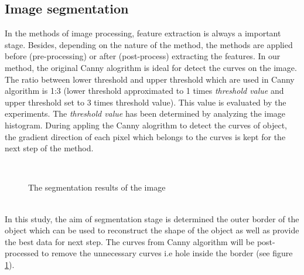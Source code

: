 \documentclass[twoside,twocolumn,10pt]{article}
\begin{document}
\subsection{Image segmentation}
In the methods of image processing, feature extraction is always a
important stage. Besides, depending on the nature of the method, the
methods are applied before (pre-processing) or after (post-process)
extracting the features. In our method, the original Canny
alogrithm\cite{canny} is ideal for detect the curves on the image. The
ratio between lower threshold and upper threshold which are used in
Canny algorithm is 1:3 (lower threshold approximated to 1 times
\textit{threshold value} and upper threshold set to 3 times threshold
value). This value is evaluated by the experiments. The
\textit{threshold value} has been determined by analyzing the image
histogram. During appling the Canny alogrithm to detect the curves of
object, the gradient direction of each pixel which belongs to the
curves is kept for the next step of the method.

\begin{figure}[h]
\centering
{}~~ 
\caption{The segmentation results of the image}
\label{canny}
\end{figure}~\\[0.2cm]
In this study, the aim of segmentation stage is determined the outer
border of the object which can be used to reconstruct the shape of the
object as well as provide the best data for next step. The curves from
Canny algorithm will be post-processed to remove the unnecessary
curves i.e hole inside the border (see figure \ref{canny}).
\end{document}
